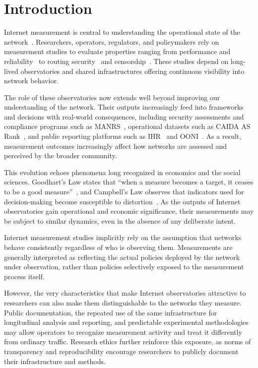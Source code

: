 \documentclass[sigconf, 10pt]{acmart}
\begin{document}
\maketitle

\section{Introduction}

Internet measurement is central to understanding the operational state of the network~\cite{clark}. Researchers, operators, regulators, and policymakers rely on measurement studies to evaluate properties ranging from performance and reliability~\cite{zoom,mlab} to routing security~\cite{rscope,friends,aspa,randy,rovista} and censorship~\cite{CenRL,iris,censoredplanet,bashir}. These studies depend on long-lived observatories and shared infrastructures offering continuous visibility into network behavior.

The role of these observatories now extends well beyond improving our understanding of the network. Their outputs increasingly feed into frameworks and decisions with real-world consequences, including security assessments and compliance programs such as MANRS~\cite{manrs}, operational datasets such as CAIDA AS Rank~\cite{caida_asrank}, and public reporting platforms such as IHR~\cite{ihr} and OONI~\cite{ooni}. As a result, measurement outcomes increasingly affect how networks are assessed and perceived by the broader community.

This evolution echoes phenomena long recognized in economics and the social sciences. Goodhart's Law states that ``when a measure becomes a target, it ceases to be a good measure''~\cite{goodhart}, and Campbell's Law observes that indicators used for decision-making become susceptible to distortion~\cite{campbell}. As the outputs of Internet observatories gain operational and economic significance, their measurements may be subject to similar dynamics, even in the absence of any deliberate intent.

Internet measurement studies implicitly rely on the assumption that networks behave consistently regardless of who is observing them. Measurements are generally interpreted as reflecting the actual policies deployed by the network under observation, rather than policies selectively exposed to the measurement process itself.

However, the very characteristics that make Internet observatories attractive to researchers can also make them distinguishable to the networks they measure. Public documentation, the repeated use of the same infrastructure for longitudinal analysis and reporting, and predictable experimental methodologies may allow operators to recognize measurement activity and treat it differently from ordinary traffic. Research ethics further reinforce this exposure, as norms of transparency and reproducibility encourage researchers to publicly document their infrastructure and methods.
\end{document}

